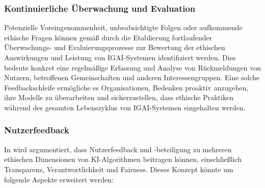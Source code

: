 \documentclass[12pt]{report}
\begin{document}
\subsubsection{Kontinuierliche Überwachung und Evaluation}
Potenzielle Voreingenommenheit, unbeabsichtigte Folgen oder aufkommende ethische Fragen können gemäß \cite{EUCommision} durch die Etablierung fortlaufender Überwachungs- und Evaluierungsprozesse zur Bewertung der ethischen Auswirkungen und Leistung von \ac{IGAI}-Systemen identifiziert werden. Dies bedeute konkret eine regelmäßige Erfassung und Analyse von Rückmeldungen von Nutzern, betroffenen Gemeinschaften und anderen Interessengruppen. Eine solche Feedbackschleife ermögliche es Organisationen, Bedenken proaktiv anzugehen, ihre Modelle zu überarbeiten und sicherzustellen, dass ethische Praktiken während des gesamten Lebenszyklus von \ac{IGAI}-Systemen eingehalten werden.

\subsubsection{Nutzerfeedback}
In \cite[The ethics of algorithms: Mapping the debate]{Mittelstadt} wird argumentiert, dass Nutzerfeedback und -beteiligung zu mehreren ethischen Dimensionen von \ac{KI}-Algorithmen beitragen können, einschließlich Transparenz, Verantwortlichkeit und Fairness. Dieses Konzept könnte um folgende Aspekte erweitert werden:
\end{document}
